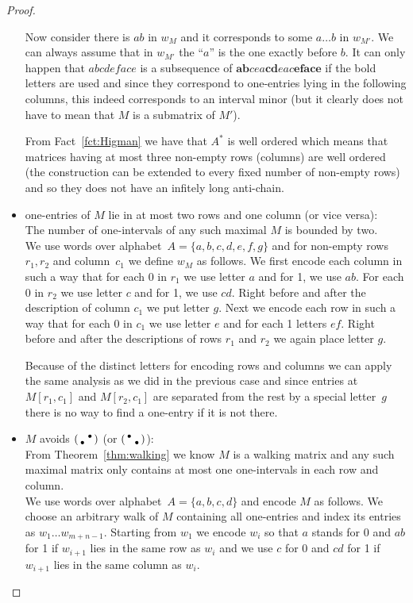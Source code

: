 \begin{proof}
\begin{itemize}
		Now consider there is $ab$ in $w_M$ and it corresponds to some $a\dots b$ in $w_{M'}$. We can always assume that in $w_{M'}$ the ``$a$'' is the one exactly before $b$. It can only happen that $abcdeface$ is a subsequence of $\textbf{ab}cea\textbf{cd}eac\textbf{eface}$ if the bold letters are used and since they correspond to one-entries lying in the following columns, this indeed corresponds to an interval minor (but it clearly does not have to mean that $M$ is a submatrix of $M'$).

		From Fact~\ref{fct:Higman} we have that $A^*$ is well ordered which means that matrices having at most three non-empty rows (columns) are well ordered (the construction can be extended to every fixed number of non-empty rows) and so they does not have an infitely long anti-chain.
	\item one-entries of $M$ lie in at most two rows and one column (or vice versa):\\
		The number of one-intervals of any such maximal $M$ is bounded by two.\\
		
		We use words over alphabet~$A=\{a,b,c,d,e,f,g\}$ and for non-empty rows~$r_1,r_2$ and column~$c_1$ we define $w_M$ as follows. We first encode each column in such a way that for each 0 in $r_1$ we use letter $a$ and for 1, we use $ab$. For each 0 in $r_2$ we use letter $c$ and for 1, we use $cd$. Right before and after the description of column $c_1$ we put letter $g$. Next we encode each row in such a way that for each 0 in $c_1$ we use letter $e$ and for each 1 letters $ef$. Right before and after the descriptions of rows $r_1$ and $r_2$ we again place letter $g$.
		
		Because of the distinct letters for encoding rows and columns we can apply the same analysis as we did in the previous case and since entries at $M[r_1,c_1]$ and $M[r_2,c_1]$ are separated from the rest by a special letter~$g$ there is no way to find a one-entry if it is not there.
	\item $M$ avoids $\left(\begin{smallmatrix} &\bullet\\\bullet& \end{smallmatrix}\right)$ (or $\left(\begin{smallmatrix}\bullet& \\ &\bullet\end{smallmatrix}\right)$):\\
		From Theorem~\ref{thm:walking} we know $M$ is a walking matrix and any such maximal matrix only contains at most one one-intervals in each row and column.\\
		
		We use words over alphabet~$A=\{a,b,c,d\}$ and encode $M$ as follows. We choose an arbitrary walk of $M$ containing all one-entries and index its entries as $w_1\dots w_{m+n-1}$. Starting from $w_1$ we encode $w_i$ so that $a$ stands for 0 and $ab$ for 1 if $w_{i+1}$ lies in the same row as $w_i$ and we use $c$ for 0 and $cd$ for 1 if $w_{i+1}$ lies in the same column as $w_i$.
\end{itemize}


\end{proof}
